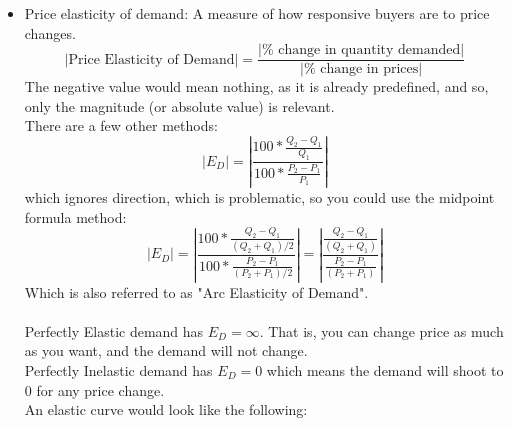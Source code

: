 \documentclass[nobib]{tufte-handout}
\begin{document}
\begin{itemize}
    \item Price elasticity of demand:
    A measure of how responsive buyers are to price changes. 
    \begin{equation*}
        |\text{Price Elasticity of Demand}| = \frac{|\%\text{ change in quantity demanded}|}{|\%\text{ change in prices}|}
    \end{equation*}
    The negative value would mean nothing, as it is already predefined, and so, only the magnitude (or absolute value) is relevant.\\
    There are a few other methods:
    \begin{equation*}
        |E_D| = \left\vert \frac{100*\frac{Q_2-Q_1}{Q_1}}{100*\frac{P_2-P_1}{P_1}}\right\vert
    \end{equation*}
    which ignores direction, which is problematic, so you could use the midpoint formula method:
    \begin{equation*}
        |E_D| = \left\vert \frac{100*\frac{Q_2-Q_1}{(Q_2+Q_1)/2}}{100*\frac{P_2-P_1}{(P_2+P_1)/2}}\right\vert = \left\vert \frac{\frac{Q_2-Q_1}{(Q_2+Q_1)}}{\frac{P_2-P_1}{(P_2+P_1)}}\right\vert
    \end{equation*}
    Which is also referred to as "Arc Elasticity of Demand".\\~\\
    Perfectly Elastic demand has $E_D = \infty$. That is, you can change price as much as you want, and the demand will not change.\\
    Perfectly Inelastic demand has $E_D = 0$ which means the demand will shoot to 0 for any price change.\\
    An elastic curve would look like the following:
    \begin{center}

\end{center}
\end{itemize}
\end{document}
